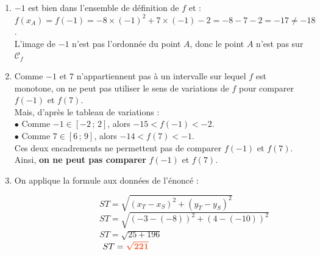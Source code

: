 \documentclass[a4paper,11pt]{article}
\newcounter{seancenum}
\newcounter{seancenumD}
\begin{document}
\setcounter{seancenumD}{22}
\newpage
\begin{seanceD}{} %

\begin{enumerate}
\item  $-1$ est bien dans l'ensemble de définition de $f$ et :\\ 
                $f(x_A)=f(-1)=-8\times (-1)^2+7\times(-1)-2
                =-8-7-2=-17\neq-18$.\\
                L'image de $-1$ n'est pas l'ordonnée du point $A$, donc le point $A$ n'est pas sur $\mathscr{C}_f$

\item  Comme $-1$ et $7$ n'appartiennent pas à un intervalle sur lequel $f$ est monotone, on ne peut pas utiliser le sens de variations de $f$ pour comparer $f(-1)$ et $f(7)$.\\
                Mais, d'après le tableau de variations : \\
                $\bullet$ Comme $-1\in [-2\,;\,2]$, alors $-15 < f(-1) < -2$. \\
                $\bullet$ Comme $7\in [6\,;\,9]$, alors $-14 < f(7) < -1$. \\
                Ces deux encadrements ne permettent pas de comparer  $f(-1)$ et  $f(7)$.\\
                Ainsi, {\bfseries \color[HTML]{f15929}on ne peut pas comparer} $f(-1)$ et  $f(7)$.  

\item  On applique la formule aux données de l'énoncé :

\medskip
$\phantom{On applique la formule  : } ST=\sqrt{\left(x_T-x_S\right)^{2}+\left(y_T-y_S\right)^{2}}$\\$\phantom{On applique la formule  : }ST=\sqrt{\left(-3-(-8)\right)^{2}+\left(4-(-10)\right)^{2}}$\\$\phantom{On applique la formule :        } ST=\sqrt{25+196}$\\$\phantom{On applique la formule  :        } ST={\color[HTML]{f15929}\boldsymbol{\sqrt{221}}}$\\


\end{enumerate}
\end{seanceD}
\end{document}
